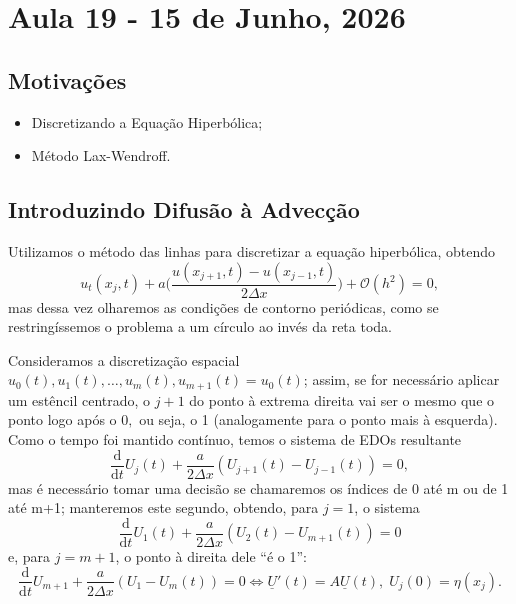 \documentclass[../differential_methods.tex]{subfiles}
\begin{document}
\section{Aula 19 - 15 de Junho, 2026}
\subsection{Motivações}
\begin{itemize}
	\item Discretizando a Equação Hiperbólica;
	\item Método Lax-Wendroff.
\end{itemize}
\subsection{Introduzindo Difusão à Advecção}
Utilizamos o método das linhas para discretizar a equação hiperbólica, obtendo
\[
	u_{t}(x_{j}, t) + a \biggl(\frac{u(x_{j+1}, t)-u(x_{j-1}, t)}{2\Delta x}\biggr) + \mathcal{O}(h^{2}) = 0,
\]
mas dessa vez olharemos as condições de contorno periódicas, como se restringíssemos o problema a um círculo ao invés da reta toda.

Consideramos a discretização espacial \(u_{0}(t), u_{1}(t), \dotsc , u_{m}(t), u_{m+1}(t) = u_{0}(t)\); assim, se for necessário aplicar um estêncil centrado, o \(j+1\) do ponto à extrema direita vai ser o mesmo que o ponto logo após o \(0,\) ou seja, o 1 (analogamente para o ponto mais à esquerda).
Como o tempo foi mantido contínuo, temos o sistema de EDOs resultante
\[
	\frac{\mathrm{d}}{\mathrm{d}t}U_{j}(t) + \frac{a}{2\Delta x}(U_{j+1}(t)-U_{j-1}(t)) = 0,
\]
mas é necessário tomar uma decisão se chamaremos os índices de 0 até m ou de 1 até m+1; manteremos este segundo, obtendo, para \(j=1\), o sistema
\[
	\frac{\mathrm{d}}{\mathrm{d}t}U_{1}(t) + \frac{a}{2\Delta x}(U_{2}(t) - U_{m+1}(t)) = 0
\]
e, para \(j=m+1\), o ponto à direita dele ``é o 1'':
\[
	\frac{\mathrm{d}}{\mathrm{d}t}U_{m+1}+\frac{a}{2\Delta x}(U_{1}-U_{m}(t))=0 \Longleftrightarrow \underline{U}'(t) = A \underline{U}(t),\; U_{j}(0) = \eta(x_{j}).
\]
\end{document}
